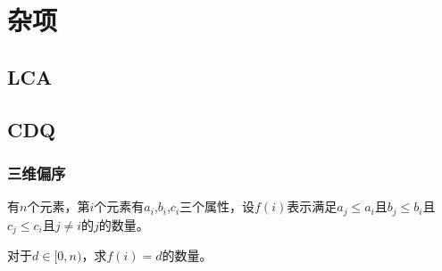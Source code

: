 \documentclass{article}
\begin{document}
\section{杂项}
\subsection{LCA}


\subsection{CDQ}
\subsubsection{三维偏序}
有$n$个元素，第$i$个元素有$a_i$,$b_i$,$c_i$三个属性，设$f(i)$表示满足$a_j \leq a_i$且$b_j \leq b_i$且$c_j \leq c_i$且$j \ne i$的$j$的数量。\par
对于$d\in [0, n)$，求$f(i)=d$的数量。




\end{document}
